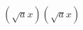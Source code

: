 \documentclass[preview]{standalone}
\begin{document}
\begin{center}
$(\sqrt{a}x)(\sqrt{a}x)$
\end{center}
\end{document}
